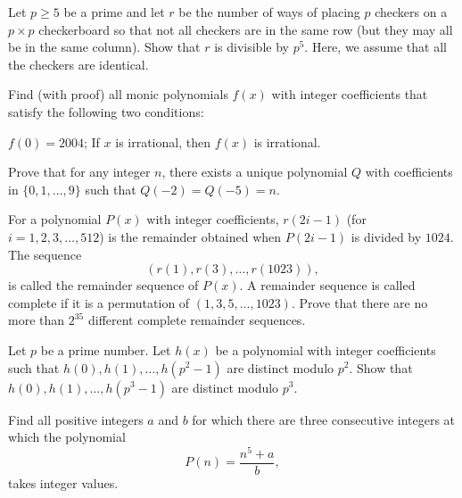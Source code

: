 \begin{question}[name={2006 APMO}]
    Let $p\ge5$ be a prime and let $r$ be the number of ways of placing $p$ checkers on a $p\times p$ checkerboard so that not all checkers are in the same row (but they may all be in the same column). Show that $r$ is divisible by $p^5$. Here, we assume that all the checkers are identical.
\end{question}

\begin{question}[name={2004 Bay Area Math Olympiad}]
    Find (with proof) all monic polynomials $f(x)$ with integer coefficients that satisfy the following two conditions:
    \begin{tasks}
        \task $f(0)=2004$;
        \task If $x$ is irrational, then $f(x)$ is irrational.
    \end{tasks}
\end{question}

\begin{question}[name={1997 USAMO}]
    Prove that for any integer $n$, there exists a unique polynomial $Q$ with coefficients in $\{0,1,\ldots,9\}$ such that $Q(-2) = Q(-5) = n$.
\end{question}

\begin{question}[name={2007 USA TST}]
    For a polynomial $ P(x)$ with integer coefficients, $r(2i - 1)$ (for $ i = 1,2,3,\dots,512$) is the remainder obtained when $ P(2i - 1)$ is divided by $ 1024$. The sequence
    \[ (r(1),r(3),\dots,r(1023)),\]
    is called the remainder sequence of $P(x)$. A remainder sequence is called complete if it is a permutation of $(1,3,5,\ldots,1023)$. Prove that there are no more than $ 2^{35}$ different complete remainder sequences.
\end{question}

\begin{question}[name={2008 Putnam}]
    Let $p$ be a prime number. Let $h(x)$ be a polynomial with integer coefficients such that $h(0),h(1),\dots, h(p^2-1)$ are distinct modulo $p^2$. Show that $h(0),h(1),\dots, h(p^3-1)$ are distinct modulo $p^3$.
\end{question}

\begin{question}[name={2013 EGMO}]
    Find all positive integers $a$ and $b$ for which there are three consecutive integers at which the polynomial\[ P(n) = \frac{n^5+a}{b}, \] takes integer values.
\end{question}

